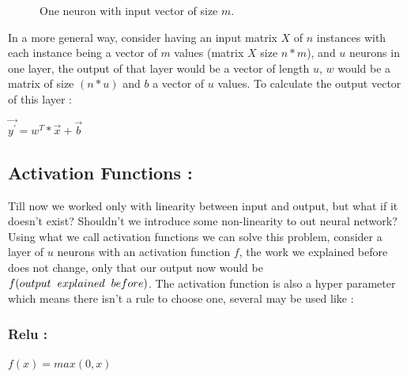 \documentclass[10pt,a4paper]{article}
\begin{document}
\begin{figure}[H]
\centering
{}
\caption{One neuron with input vector of size $ m $.}
\end{figure}


In a more general way, consider having an input matrix $ X $ of $ n $ instances with each instance being a vector of $ m $ values (matrix $ X $ size $ n*m $), and $ u $ neurons in one layer, the output of that layer would be a vector of length $ u $, $ w $ would be a matrix of size $ (n*u) $ and $ b $ a vector of $ u $ values. To calculate the output vector of this layer :\\
\begin{center}
$ \vec{y^{\prime}} = w^{T}*\vec{x} + \vec{b} $
\end{center}

\subsection{Activation Functions :}
Till now we worked only with linearity between input and output, but what if it doesn't exist? Shouldn't we introduce some non-linearity to out neural network? Using what we call activation functions we can solve this problem, consider a layer of $ u $ neurons with an activation function $ f $, the work we explained before does not change, only that our output now would be $ f(output \hspace{2mm} explained \hspace{2mm} before) $. The activation function is also a hyper parameter which means there isn't a rule to choose one, several may be used like :
\subsubsection{Relu :}
\begin{center}
$ f(x) = max(0,x) $
\end{center}
\end{document}
